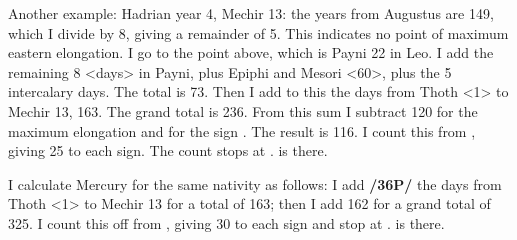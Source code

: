 Another example: Hadrian year 4, Mechir 13: the years from Augustus are 149, which I divide by 8, giving a remainder of 5. This indicates no point of maximum eastern elongation. I go to the point above, which is Payni 22 in Leo. I add the remaining 8 <days> in Payni, plus Epiphi and Mesori <60>, plus the
5 intercalary days. The total is 73. Then I add to this the days from Thoth <1> to Mechir 13, 163. The grand total is 236. From this sum I subtract 120 for the maximum elongation and for the sign \Leo. The result is 116. I count this from \Virgo, giving 25 to each sign. The count stops at \Capricorn\xspace 16\deg. \Venus\xspace is there.

I calculate Mercury for the same nativity as follows: I add \textbf{/36P/} the days from Thoth <1> to Mechir 13 for a total of 163; then I add 162 for a grand total of 325. I count this off from \Aries, giving 30 to each sign and stop at \Aquarius\xspace 25\deg. \Mercury\xspace is there.

\newpage